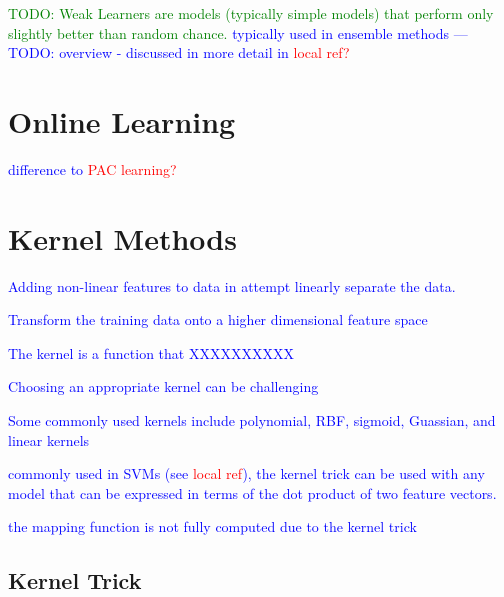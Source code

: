 \textcolor{green}{TODO: Weak Learners are models (typically simple models) that perform only slightly better than random chance.} \textcolor{blue}{typically used in ensemble methods --- TODO: overview - discussed in more detail in \textcolor{red}{local ref?}}


\section{Online Learning}

\textcolor{blue}{difference to \textcolor{red}{PAC learning?}}



\section{Kernel Methods}
\label{sec:kernel_trick}

\textcolor{blue}{Adding non-linear features to data in attempt linearly separate the data.}


\textcolor{blue}{Transform the training data onto a higher dimensional feature space}


\textcolor{blue}{The kernel is a function that XXXXXXXXXX}

\textcolor{blue}{Choosing an appropriate kernel can be challenging}


\textcolor{blue}{Some commonly used kernels include polynomial, RBF, sigmoid, Guassian, and linear kernels}

\textcolor{blue}{commonly used in SVMs (see \textcolor{red}{local ref}), the kernel trick can be used with any model that can be expressed in terms of the dot product of two feature vectors.}

\textcolor{blue}{the mapping function is not fully computed due to the kernel trick}

\subsection{Kernel Trick}

